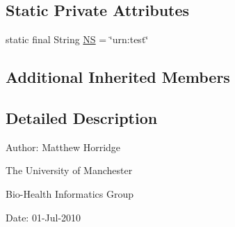 \subsection*{Static Private Attributes}
\begin{DoxyCompactItemize}
\item 
static final String \hyperlink{classorg_1_1semanticweb_1_1owlapi_1_1api_1_1test_1_1syntax_1_1_o_w_l_x_m_l_null_pointer_test_case_a5d1a53119de151ae3d619f34390dc92b}{N\-S} = \char`\"{}urn\-:test\char`\"{}
\end{DoxyCompactItemize}
\subsection*{Additional Inherited Members}


\subsection{Detailed Description}
Author\-: Matthew Horridge\par
 The University of Manchester\par
 Bio-\/\-Health Informatics Group\par
 Date\-: 01-\/\-Jul-\/2010 

